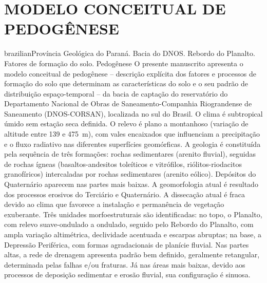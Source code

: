 \artigotrue
\chapter{MODELO CONCEITUAL DE PEDOGÊNESE}
\label{chap:chap03}


\def\ptkeys{Província Geológica do Paraná. Bacia do DNOS. Rebordo do Planalto. Fatores de formação do solo. 
Pedogênese}

\begin{chapterabstract}{brazilian}{\ptkeys}
O presente manuscrito apresenta o modelo conceitual de pedogênese -- descrição explícita dos fatores e 
processos de formação do solo que determinam as características do solo e o seu padrão de distribuição 
espaço-temporal -- da bacia de captação do reservatório do Departamento Nacional de Obras de 
Saneamento-Companhia Riograndense de Saneamento (DNOS-CORSAN), localizada no sul do Brasil. O clima é 
subtropical úmido sem estação seca definida. O relevo é plano a montanhoso (variação de altitude entre 139 e 
\SI{475}{\m}), com vales encaixados que influenciam a precipitação e o fluxo radiativo nas diferentes 
superfícies geomórficas. A geologia é constituída pela sequência de três formações: rochas sedimentares 
(arenito fluvial), seguidas de rochas ígneas (basaltos-andesitos toleíticos e vitrófilos, 
riólitos-riodacitos granofíricos) intercaladas por rochas sedimentares (arenito eólico). Depósitos do 
Quaternário aparecem nas partes mais baixas. A geomorfologia atual é resultado dos processos erosivos do 
Terciário e Quaternário. A dissecação atual é fraca devido ao clima que favorece a instalação e permanência de 
vegetação exuberante. Três unidades morfoestruturais são identificadas: no topo, o Planalto, com relevo 
suave-ondulado a ondulado, seguido pelo Rebordo do Planalto, com ampla variação altimétrica, declividade 
acentuada e escarpas abruptas; na base, a Depressão Periférica, com formas agradacionais de planície fluvial. 
Nas partes altas, a rede de 
drenagem apresenta padrão bem definido, geralmente retangular, determinada pelas falhas e/ou fraturas. Já nas 
áreas mais baixas, devido aos processos de deposição sedimentar e erosão fluvial, sua configuração é sinuosa. 

\end{chapterabstract}
